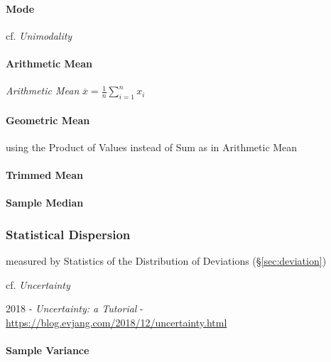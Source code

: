 \paragraph{Mode}\label{sec:mode}\hfill

cf. \emph{Unimodality}



\paragraph{Arithmetic Mean}\label{sec:arithmetic_mean}\hfill

\emph{Arithmetic Mean} $\overline{x} = \frac{1}{n}\sum_{i=1}^n x_i$



\paragraph{Geometric Mean}\label{sec:geometric_mean}\hfill

using the Product of Values instead of Sum as in Arithmetic Mean



\paragraph{Trimmed Mean}\label{sec:trimmed_mean}\hfill

\paragraph{Sample Median}\label{sec:median}\hfill



\subsubsection{Statistical Dispersion}\label{sec:statistical_dispersion}

measured by Statistics of the Distribution of Deviations (\S\ref{sec:deviation})

cf. \emph{Uncertainty}

2018 - \emph{Uncertainty: a Tutorial} -
\url{https://blog.evjang.com/2018/12/uncertainty.html}



\paragraph{Sample Variance}\label{sec:variability}\hfill

